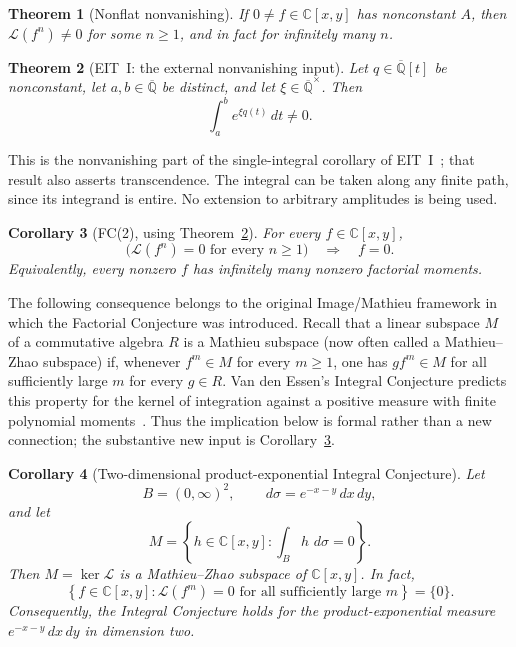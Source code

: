 \documentclass[11pt]{article}
\numberwithin{equation}{section}
\newtheorem{theorem}{Theorem}[section]
\newtheorem{corollary}[theorem]{Corollary}
\theoremstyle{definition}\newtheorem{definition}[theorem]{Definition}
\theoremstyle{remark}\newtheorem{remark}[theorem]{Remark}
\newcommand{\C}{\mathbb C}
\newcommand{\Qb}{\overline{\mathbb Q}}
\newcommand{\Lfac}{\mathcal L}
\newcommand{\dd}{\,d}
\begin{document}
\begin{theorem}[Nonflat nonvanishing]\label{thm:nonflat}
If $0\ne f\in\C[x,y]$ has nonconstant $A$, then $\Lfac(f^n)\ne0$ for some
$n\ge1$, and in fact for infinitely many $n$.
\end{theorem}

\begin{theorem}[EIT~I: the external nonvanishing input]\label{thm:eit}
Let $q\in\Qb[t]$ be nonconstant, let $a,b\in\Qb$ be distinct, and let
$\xi\in\Qb^\times$. Then
\[
 \int_a^b e^{\xi q(t)}\dd t\ne0.
\]
\end{theorem}
This is the nonvanishing part of the single-integral corollary of
EIT~I~\cite[Corollary~1.4, source label \texttt{cor:single}]{EIT};
that result also asserts
transcendence. The integral can be taken along any finite path, since its
integrand is entire. No extension to arbitrary amplitudes is being used.

\begin{corollary}[FC(2), using Theorem~\ref{thm:eit}]\label{cor:fc2}
For every $f\in\C[x,y]$,
\[
 \bigl(\Lfac(f^n)=0\text{ for every }n\ge1\bigr)\quad\Longrightarrow\quad f=0.
\]
Equivalently, every nonzero $f$ has infinitely many nonzero factorial moments.
\end{corollary}

The following consequence belongs to the original Image/Mathieu framework
in which the Factorial Conjecture was introduced. Recall that a linear
subspace $M$ of a commutative algebra $R$ is a Mathieu subspace (now
often called a Mathieu--Zhao subspace) if,
whenever $f^m\in M$ for every $m\ge1$, one has $gf^m\in M$ for all
sufficiently large $m$ for every $g\in R$. Van den Essen's Integral
Conjecture predicts this property for the kernel of integration against a
positive measure with finite polynomial moments~\cite{AmazingImage}.
Thus the implication below is formal rather than a new connection; the
substantive new input is Corollary~\ref{cor:fc2}.

\begin{corollary}[Two-dimensional product-exponential Integral Conjecture]
\label{cor:integral-mathieu}
Let
\[
 B=(0,\infty)^2,\qquad
 \dd\sigma=e^{-x-y}\dd x\dd y,
\]
and let
\[
 M=\left\{h\in\C[x,y]:
       \int_B h\,\dd\sigma=0\right\}.
\]
Then $M=\ker\Lfac$ is a Mathieu--Zhao subspace of $\C[x,y]$. In fact,
\[
 \left\{f\in\C[x,y]:
   \Lfac(f^m)=0\text{ for all sufficiently large }m\right\}=\{0\}.
\]
Consequently, the Integral Conjecture holds for the product-exponential
measure $e^{-x-y}\dd x\dd y$ in dimension two.
\end{corollary}
\end{document}
